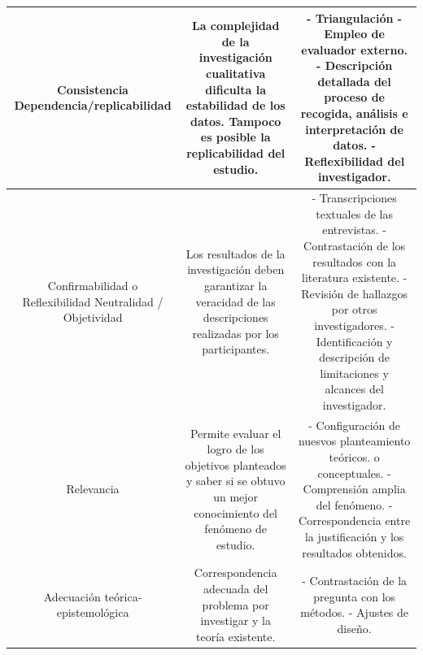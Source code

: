 \documentclass[12pt, a4paper, nofontenc, numbers=endperiod]{apa7}
\begin{document}
{\begin{table}[h]
{{\begin{tabular}{|c|c|c|}
				\hline
				\multicolumn{1}{|p{4.50cm}|}{\vspace*{10mm}\centering \hspace*{0.5cm}Consistencia \newline \newline Dependencia/replicabilidad} &   \multicolumn{1}{p{4.50cm}|}{\vspace*{0.1mm} La complejidad de la investigación cualitativa dificulta la estabilidad de los datos. Tampoco es posible la replicabilidad del estudio.} & \multicolumn{1}{p{4.50cm}|}{- Triangulación  - Empleo de evaluador externo. \newline - Descripción detallada del proceso de recogida, análisis e interpretación de datos. \newline - Reflexibilidad del investigador.} \\
				\hline
				
				\multicolumn{1}{|p{4.50cm}|}{\vspace*{10mm}\centering Confirmabilidad o Reflexibilidad \newline \newline Neutralidad / Objetividad} &  \multicolumn{1}{p{4.50cm}|}{\vspace*{0.1mm} Los resultados de la investigación deben garantizar la veracidad de las descripciones realizadas por los participantes.}& \multicolumn{1}{p{4.50cm}|}{- Transcripciones textuales de las entrevistas.  \newline - Contrastación de los resultados con la literatura existente. \newline - Revisión de hallazgos por otros investigadores. \newline - Identificación y descripción de limitaciones y alcances del investigador.}
				\\
				\hline
				\multicolumn{1}{|p{4.50cm}|}{\vspace*{15mm}\centering Relevancia} &  \multicolumn{1}{p{4.50cm}|}{\vspace*{0.1mm}Permite evaluar el logro de los objetivos planteados y saber si se obtuvo un mejor conocimiento del fenómeno de estudio.}&\multicolumn{1}{p{4.50cm}|}{ - Configuración de nuesvos planteamiento teóricos. o conceptuales. \newline - Comprensión amplia del fenómeno. \newline - Correspondencia entre la justificación y los resultados obtenidos.}
				\\
				\hline
				
				\multicolumn{1}{|p{4.50cm}|}{\vspace*{0.1mm}\centering Adecuación teórica-epistemológica} &  \multicolumn{1}{p{4.50cm}|}{Correspondencia adecuada del problema por investigar y la teoría existente.}& \multicolumn{1}{p{4.50cm}|}{- Contrastación de la pregunta con los métodos. \newline - Ajustes de diseño. }
				\\
				

\end{tabular}}}
\end{table}}
\end{document}
